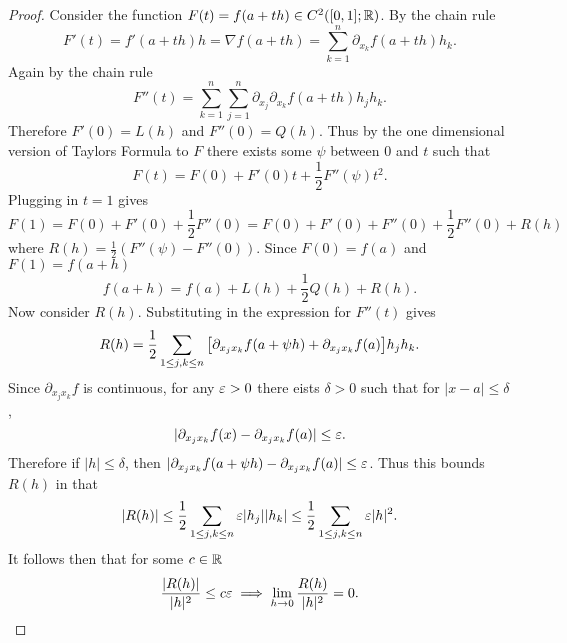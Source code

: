 \documentclass[../main.tex]{subfiles}
\begin{document}
\begin{proof}
    Consider the function $F(t) = f(a + th) \in C^2([0,1]; \mathbb{R})$. By the chain rule
    \[
        F'(t) = f'(a + th) h = \nabla f(a + th) = \sum_{k=1}^n \partial_{x_k} f(a + th)  h_k
    .\]
    Again by the chain rule
    \[
        F''(t) = \sum_{k=1}^n \sum_{j=1}^n \partial_{x_j} \partial_{x_k} f(a+th) h_j h_k
    .\]
    Therefore $F'(0) = L(h)$ and $F''(0) = Q(h)$. Thus by the one dimensional version of Taylors Formula to $F$ there exists some $\psi$ between $0$ and $t$ such that
    \[
        F(t) = F(0) + F'(0)t + \frac{1}{2} F''(\psi) t^2
    .\]
    Plugging in $t = 1$ gives
    \[
        F(1) = F(0) + F'(0) + \frac{1}{2} F''(0) = F(0) + F'(0) + F''(0) + \frac{1}{2} F''(0) + R(h)
    \]
    where $R(h) = \frac{1}{2} (F''(\psi) - F''(0))$. Since $F(0) = f(a)$ and $F(1) = f(a + h)$
    \[
        f(a + h) = f(a) + L(h) + \frac{1}{2} Q(h) + R(h)
    .\]
    Now consider $R(h)$. Substituting in the expression for $F''(t)$ gives
    \[
        R(h) = \frac{1}{2} \sum_{1 \leq j,k \leq n} \qty[\partial_{x_j x_k} f(a + \psi h) + \partial_{x_j x_k} f(a)] h_j h_k
    .\]
    Since $\partial_{x_j x_k} f$ is continuous, for any $\varepsilon > 0$ there eists $\delta > 0$ such that for $|x - a| \leq \delta$,
    \[
        |\partial_{x_j x_k} f(x) - \partial_{x_j x_k} f(a)| \leq \varepsilon
    .\]
    Therefore if $|h| \leq \delta$, then $|\partial_{x_j x_k} f(a + \psi h) - \partial_{x_j x_k} f(a)| \leq \varepsilon$. Thus this bounds $R(h)$ in that
    \[
        |R(h)| \leq \frac{1}{2} \sum_{1 \leq j,k \leq n} \varepsilon |h_j| |h_k| \leq \frac{1}{2} \sum_{1 \leq j,k \leq n} \varepsilon |h|^2
    .\]
    It follows then that for some $c \in \mathbb{R}$
    \[
        \frac{|R(h)|}{|h|^2} \leq c \varepsilon \implies \lim_{h \to 0} \frac{R(h)}{|h|^2} = 0
    .\]
\end{proof}
\end{document}
